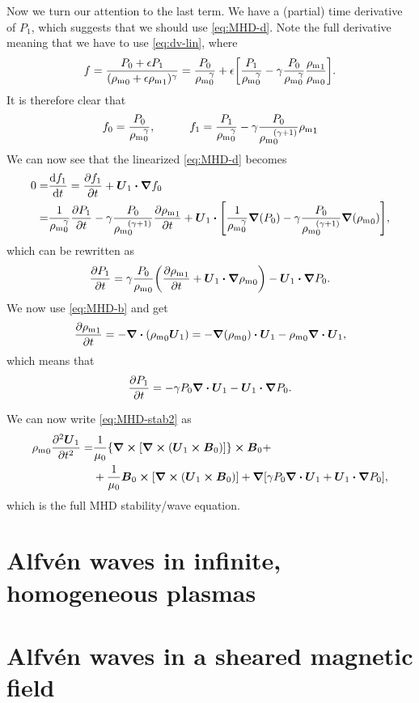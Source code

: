 \documentclass[11pt,a4paper, 
swedish, english %
]{article}
\newcommand{\rhom}{\ensuremath{{\rho_{\text{m}}}}}
\begin{document}
Now we turn our attention to the last term. We have a (partial) time
derivative of $P_1$, which suggests that we should use
\eqref{eq:MHD-d}. Note the full derivative meaning that we have to
use \eqref{eq:dv-lin},
where
\begin{equation}
f=\frac{P_0+\epsilon P_1}{(\rhom_0+\epsilon\rhom_1)^\gamma}
=\frac{P_0}{\rhom_0^\gamma}+\epsilon\qty[
\frac{P_1}{\rhom_0^\gamma} 
-\gamma\frac{P_0}{\rhom_0^\gamma}\frac{\rhom_1}{\rhom_0}].
\end{equation}
It is therefore clear that
\begin{equation}
f_0=\frac{P_0}{\rhom_0^\gamma}
\qc\qquad
f_1=\frac{P_1}{\rhom_0^\gamma} 
-\gamma\frac{P_0}{\rhom_0^{(\gamma+1)}}\rhom_1
\end{equation}
We can now see that the linearized \eqref{eq:MHD-d} becomes
\begin{equation}
\begin{aligned}
0=&\dv{f_1}{t}=\pdv{f_1}{t}+\vb*U_1\vdot\grad{f_0}\\
=&\frac{1}{\rhom_0^\gamma}\pdv{P_1}{t}
-\gamma\frac{P_0}{\rhom_0^{(\gamma+1)}}\pdv{\rhom_1}{t}
+\vb*U_1\vdot\qty[\frac{1}{\rhom_0^{\gamma}}\grad(P_0)
-\gamma\frac{P_0}{\rhom_0^{(\gamma+1)}}\grad(\rhom_0)],
\end{aligned}
\end{equation}
which can be rewritten as
\begin{equation}
\pdv{P_1}{t}=\gamma\frac{P_0}{\rhom_0}
\qty(\pdv{\rhom_1}{t}+\vb*U_1\vdot\grad\rhom_0)
-\vb*U_1\vdot\grad P_0.
\end{equation}
We now use \eqref{eq:MHD-b} and get
\begin{equation}
\pdv{\rhom_1}{t}=-\div(\rhom_0\vb*U_1)
=-\grad(\rhom_0)\vdot\vb*U_1
-\rhom_0\div\vb*U_1,
\end{equation}
which means that
\begin{equation}
\pdv{P_1}{t}=-\gamma P_0\div\vb*U_1
-\vb*U_1\vdot\grad P_0.
\end{equation}

We can now write \eqref{eq:MHD-stab2} as
\begin{equation}
\begin{aligned}
\rhom_0\pdv[2]{\vb*U_1}{t} =& 
\frac{1}{\mu_0}\qty{\curl\qty[\curl\qty(\vb*U_1\cross\vb*B_0)]}
\cross\vb*B_0+\\
&+\frac{1}{\mu_0}\vb*B_0\cross
\qty[\curl\qty(\vb*U_1\cross\vb*B_0)]
+\grad\qty[\gamma P_0\div\vb*U_1+\vb*U_1\vdot\grad P_0],
\end{aligned}
\end{equation}
which is the full MHD stability/wave equation. 





\section{Alfvén waves in infinite, homogeneous plasmas}

\section{Alfvén waves in a sheared magnetic field}




\end{document}
